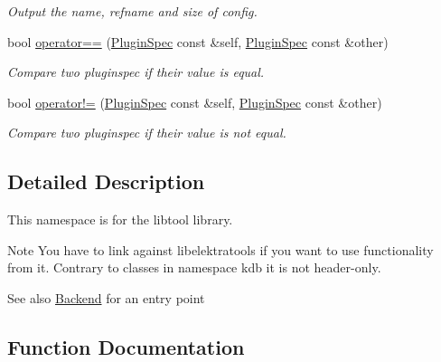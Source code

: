 \begin{DoxyCompactItemize}
\begin{DoxyCompactList}\small\item\em Output the name, refname and size of config. \end{DoxyCompactList}\item 
bool \mbox{\hyperlink{namespacekdb_1_1tools_a6f0740b75d32bfea4ef285e18b9a52f4}{operator==}} (\mbox{\hyperlink{classkdb_1_1tools_1_1PluginSpec}{Plugin\+Spec}} const \&self, \mbox{\hyperlink{classkdb_1_1tools_1_1PluginSpec}{Plugin\+Spec}} const \&other)
\begin{DoxyCompactList}\small\item\em Compare two pluginspec if their value is equal. \end{DoxyCompactList}\item 
bool \mbox{\hyperlink{namespacekdb_1_1tools_a3a09f4414aa2fe068879665d6285093e}{operator!=}} (\mbox{\hyperlink{classkdb_1_1tools_1_1PluginSpec}{Plugin\+Spec}} const \&self, \mbox{\hyperlink{classkdb_1_1tools_1_1PluginSpec}{Plugin\+Spec}} const \&other)
\begin{DoxyCompactList}\small\item\em Compare two pluginspec if their value is not equal. \end{DoxyCompactList}\end{DoxyCompactItemize}


\subsection{Detailed Description}
This namespace is for the libtool library. 

\begin{DoxyNote}{Note}
You have to link against libelektratools if you want to use functionality from it. Contrary to classes in namespace kdb it is not header-\/only.
\end{DoxyNote}
\begin{DoxySeeAlso}{See also}
\mbox{\hyperlink{classkdb_1_1tools_1_1Backend}{Backend}} for an entry point 
\end{DoxySeeAlso}


\subsection{Function Documentation}
\mbox{\label{namespacekdb_1_1tools_a3a09f4414aa2fe068879665d6285093e}} 
